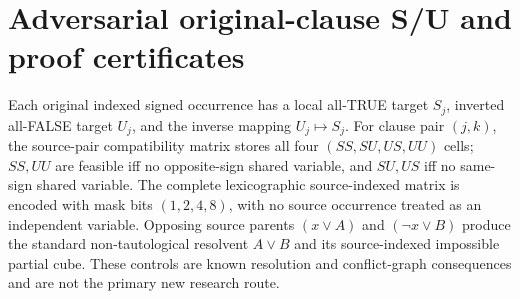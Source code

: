 \documentclass[11pt]{article}
\begin{document}
\section{Adversarial original-clause S/U and proof certificates}
Each original indexed signed occurrence has a local all-TRUE
target $S_j$, inverted all-FALSE target $U_j$, and the inverse
mapping $U_j\mapsto S_j$. For clause pair $(j,k)$, the source-pair
compatibility matrix stores all four $(SS,SU,US,UU)$ cells;
$SS,UU$ are feasible iff no opposite-sign shared variable,
and $SU,US$ iff no same-sign shared variable.
The complete lexicographic source-indexed matrix is encoded
with mask bits $(1,2,4,8)$, with no source occurrence treated
as an independent variable. Opposing source parents
$(x\vee A)$ and $(\neg x\vee B)$ produce the standard
non-tautological resolvent $A\vee B$ and its
source-indexed impossible partial cube. These controls are
known resolution and conflict-graph consequences and are
not the primary new research route.
\end{document}

